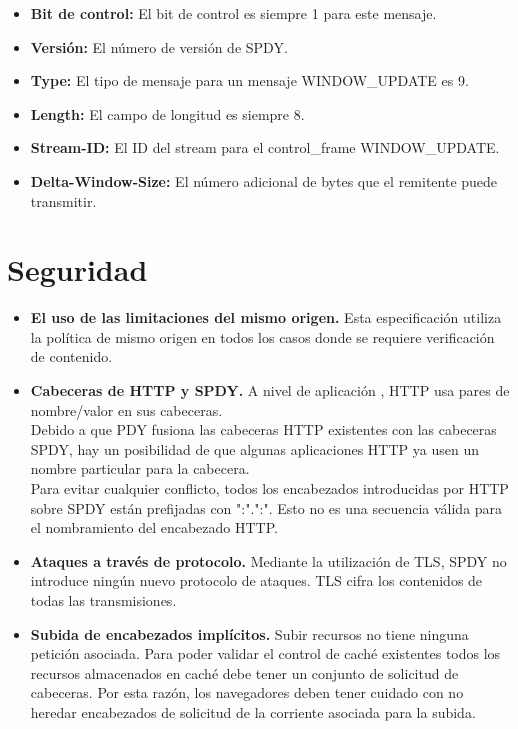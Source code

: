\begin{itemize}
    \item \textbf{Bit de control:} El bit de control es siempre 1 para este mensaje.
    \item \textbf{Versión:} El número de versión de SPDY.
    \item \textbf{Type:} El tipo de mensaje para un mensaje WINDOW\_UPDATE es 9.
    \item \textbf{Length:} El campo de longitud es siempre 8.
    \item \textbf{Stream-ID:} El ID del stream para el control\_frame WINDOW\_UPDATE.
    \item \textbf{Delta-Window-Size:} El número adicional de bytes que el remitente puede transmitir.
\end{itemize}

\section{Seguridad}
\begin{itemize}
  \item \textbf{El uso de las limitaciones del mismo origen.}
    Esta especificación utiliza la política de mismo origen en todos los casos donde se requiere verificación de contenido.
  \item \textbf{Cabeceras de HTTP y SPDY.}
    A nivel de aplicación , HTTP usa pares de nombre/valor en sus cabeceras.
    \\
    Debido a que PDY fusiona las cabeceras HTTP existentes con las cabeceras SPDY, hay un posibilidad de que algunas aplicaciones HTTP ya usen un nombre particular para la cabecera. 
	\\Para evitar cualquier conflicto, todos los encabezados introducidas por HTTP sobre SPDY están prefijadas con ":".":".  Esto no es una secuencia válida para el nombramiento del encabezado HTTP. 
\item \textbf{Ataques a través de protocolo.}
Mediante la utilización de TLS, SPDY no introduce ningún nuevo protocolo de ataques. TLS cifra los contenidos de todas las transmisiones.
\item \textbf{Subida de encabezados implícitos.}
Subir recursos no tiene ninguna petición asociada. Para poder validar el control de caché existentes todos los recursos almacenados en caché debe tener un conjunto de solicitud de cabeceras. Por esta razón, los navegadores deben tener cuidado con no heredar encabezados de solicitud de la corriente asociada para la subida. 
\end{itemize}

